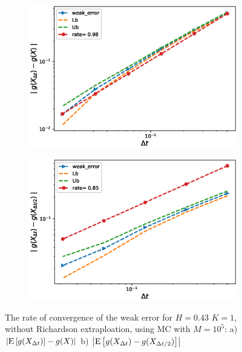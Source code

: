 \documentclass[11pt]{article}
\newcommand{\expt}[1]{\mathrm{E}\left[#1\right]}
\begin{document}
\begin{figure}[h!]
	\centering
	\begin{subfigure}{.4\textwidth}
		\centering
		\includegraphics[width=1\linewidth]{./figures/rBergomi_weak_error_rates/without_richardson/H_043/weak_convergence_order_Bergomi_H_043_K_1_M_10_5_CI_relative}
		\caption{}
		\label{fig:sub3}
	\end{subfigure}%
	\begin{subfigure}{.4\textwidth}
		\centering
		\includegraphics[width=1\linewidth]{./figures/rBergomi_weak_error_rates/without_richardson/H_043/weak_convergence_order_differences_Bergomi_H_043_K_1_M_10_5_CI_relative}
		\caption{}
		\label{fig:sub4}
	\end{subfigure}
	
	\caption{The rate of convergence of the weak error for $H=0.43$ $K=1$, without Richardson extraploation, using MC with $M=10^5$: a) $\abs{\expt{g(X_{\Delta t})}-g(X)}$  b) $\abs{\expt{g(X_{\Delta t})-g(X_{\Delta t/2})}}$ }
	\label{fig:Weak_rate_H_043_without_rich}
\end{figure}
\end{document}
